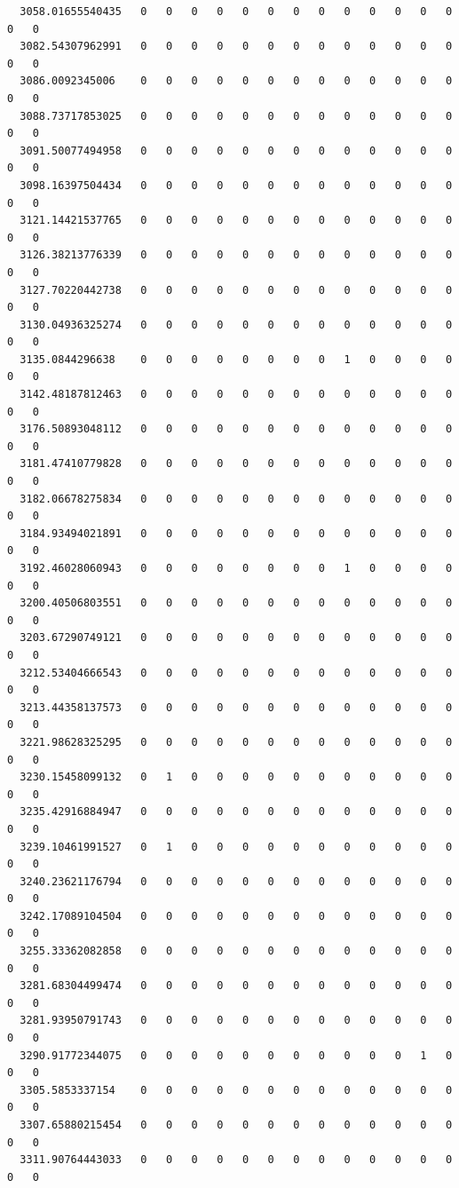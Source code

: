 \documentclass[
  letterpaper,
  DIV=11,
  numbers=noendperiod]{scrartcl}
\begin{document}
\begin{verbatim}
  3058.01655540435   0   0   0   0   0   0   0   0   0   0   0   0   0   0   0
  3082.54307962991   0   0   0   0   0   0   0   0   0   0   0   0   0   0   0
  3086.0092345006    0   0   0   0   0   0   0   0   0   0   0   0   0   0   0
  3088.73717853025   0   0   0   0   0   0   0   0   0   0   0   0   0   0   0
  3091.50077494958   0   0   0   0   0   0   0   0   0   0   0   0   0   0   0
  3098.16397504434   0   0   0   0   0   0   0   0   0   0   0   0   0   0   0
  3121.14421537765   0   0   0   0   0   0   0   0   0   0   0   0   0   0   0
  3126.38213776339   0   0   0   0   0   0   0   0   0   0   0   0   0   0   0
  3127.70220442738   0   0   0   0   0   0   0   0   0   0   0   0   0   0   0
  3130.04936325274   0   0   0   0   0   0   0   0   0   0   0   0   0   0   0
  3135.0844296638    0   0   0   0   0   0   0   0   1   0   0   0   0   0   0
  3142.48187812463   0   0   0   0   0   0   0   0   0   0   0   0   0   0   0
  3176.50893048112   0   0   0   0   0   0   0   0   0   0   0   0   0   0   0
  3181.47410779828   0   0   0   0   0   0   0   0   0   0   0   0   0   0   0
  3182.06678275834   0   0   0   0   0   0   0   0   0   0   0   0   0   0   0
  3184.93494021891   0   0   0   0   0   0   0   0   0   0   0   0   0   0   0
  3192.46028060943   0   0   0   0   0   0   0   0   1   0   0   0   0   0   0
  3200.40506803551   0   0   0   0   0   0   0   0   0   0   0   0   0   0   0
  3203.67290749121   0   0   0   0   0   0   0   0   0   0   0   0   0   0   0
  3212.53404666543   0   0   0   0   0   0   0   0   0   0   0   0   0   0   0
  3213.44358137573   0   0   0   0   0   0   0   0   0   0   0   0   0   0   0
  3221.98628325295   0   0   0   0   0   0   0   0   0   0   0   0   0   0   0
  3230.15458099132   0   1   0   0   0   0   0   0   0   0   0   0   0   0   0
  3235.42916884947   0   0   0   0   0   0   0   0   0   0   0   0   0   0   0
  3239.10461991527   0   1   0   0   0   0   0   0   0   0   0   0   0   0   0
  3240.23621176794   0   0   0   0   0   0   0   0   0   0   0   0   0   0   0
  3242.17089104504   0   0   0   0   0   0   0   0   0   0   0   0   0   0   0
  3255.33362082858   0   0   0   0   0   0   0   0   0   0   0   0   0   0   0
  3281.68304499474   0   0   0   0   0   0   0   0   0   0   0   0   0   0   0
  3281.93950791743   0   0   0   0   0   0   0   0   0   0   0   0   0   0   0
  3290.91772344075   0   0   0   0   0   0   0   0   0   0   0   1   0   0   0
  3305.5853337154    0   0   0   0   0   0   0   0   0   0   0   0   0   0   0
  3307.65880215454   0   0   0   0   0   0   0   0   0   0   0   0   0   0   0
  3311.90764443033   0   0   0   0   0   0   0   0   0   0   0   0   0   0   0
                  

\end{verbatim}
\end{document}
